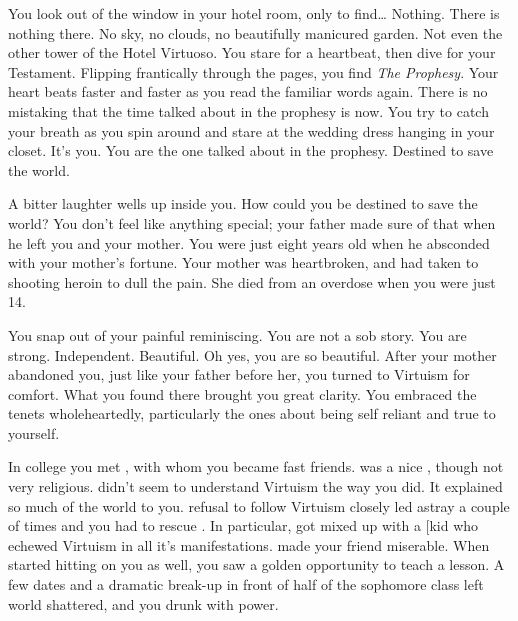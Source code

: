 \documentclass[char]{guildcamp1}
\begin{document}
\name{\cBride{}}

You look out of the window in your hotel room, only to find{\ldots} Nothing. There is nothing there. No sky, no clouds, no beautifully manicured garden. Not even the other tower of the Hotel Virtuoso. You stare for a heartbeat, then dive for your Testament. Flipping frantically through the pages, you find {\em The Prophesy}. Your heart beats faster and faster as you read the familiar words again. There is no mistaking that the time talked about in the prophesy is now. You try to catch your breath as you spin around and stare at the wedding dress hanging in your closet. It's you. You are the one talked about in the prophesy. Destined to save the world.

A bitter laughter wells up inside you. How could you be destined to save the world? You don't feel like anything special; your father made sure of that when he left you and your mother. You were just eight years old when he absconded with your mother's fortune. Your mother was heartbroken, and had taken to shooting heroin to dull the pain. She died from an overdose when you were just 14.

You snap out of your painful reminiscing. You are not a sob story. You are strong. Independent. Beautiful. Oh yes, you are so beautiful. After your mother abandoned you, just like your father before her, you turned to Virtuism for comfort. What you found there brought you great clarity. You embraced the tenets wholeheartedly, particularly the ones about being self reliant and true to yourself.

In college you met \cRival{}, with whom you became fast friends.  was a nice , though not very religious.  didn't seem to understand Virtuism the way you did. It explained so much of the world to you.  refusal to follow Virtuism closely led \cRival{} astray a couple of times and you had to rescue . In particular,  got  mixed up with a \cRivalEx[{kid} who echewed Virtuism in all it's manifestations.  made your friend miserable. When  started hitting on you as well, you saw a golden opportunity to teach  a lesson. A few dates and a dramatic break-up in front of half of the sophomore class left  world shattered, and you drunk with power.
\end{document}

